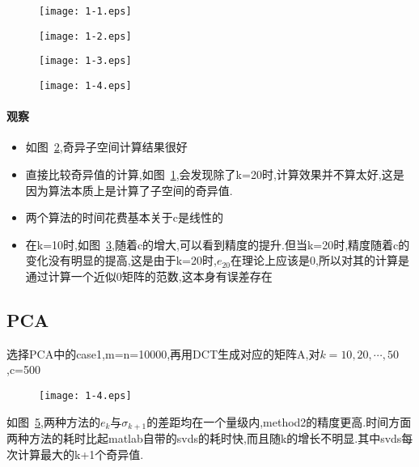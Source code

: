 \documentclass[UTF8]{ctexart}
\begin{document}
\begin{figure}[htbp]
\centering\texttt{[image: 1-1.eps]}
\caption{}\label{fig:1-1}
\end{figure}

\begin{figure}[htbp]
\centering\texttt{[image: 1-2.eps]}
\caption{}\label{fig:1-2}
\end{figure}
\begin{figure}[htbp]
\centering\texttt{[image: 1-3.eps]}
\caption{}\label{fig:1-3}
\end{figure}
\begin{figure}[htbp]
\centering\texttt{[image: 1-4.eps]}
\caption{}\label{fig:1-4}
\end{figure}

\paragraph{观察}
\begin{itemize}
    \item 如图~\ref{fig:1-2},奇异子空间计算结果很好
  \item 直接比较奇异值的计算,如图~\ref{fig:1-1},会发现除了k=20时,计算效果并不算太好,这是因为算法本质上是计算了子空间的奇异值.
  \item 两个算法的时间花费基本关于c是线性的
  \item 在k=10时,如图~\ref{fig:1-3},随着c的增大,可以看到精度的提升.但当k=20时,精度随着c的变化没有明显的提高,这是由于k=20时,$e_20$在理论上应该是0,所以对其的计算是通过计算一个近似0矩阵的范数,这本身有误差存在
\end{itemize}
\subsection{PCA}
选择PCA中的case1,m=n=10000,再用DCT生成对应的矩阵A,对$k=10,20,\cdots,50$,c=500
\begin{figure}[htbp]
\centering\texttt{[image: 1-4.eps]}
\caption{}\label{fig:1-5}
\end{figure}
如图~\ref{fig:1-5},两种方法的$e_k$与$\sigma_{k+1}$的差距均在一个量级内,method2的精度更高.时间方面两种方法的耗时比起matlab自带的svds的耗时快,而且随k的增长不明显.其中svds每次计算最大的k+1个奇异值.
  
\end{document}
